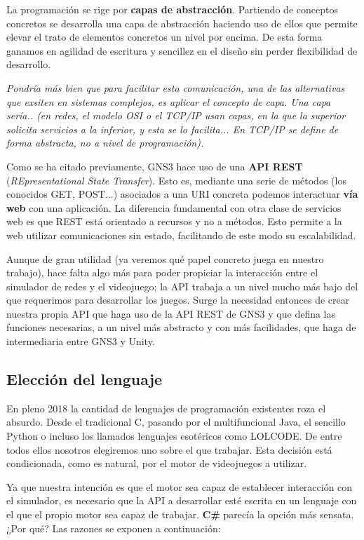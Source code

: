 La programación se rige por \textbf{capas de abstracción}. Partiendo de conceptos concretos se desarrolla una capa de abstracción haciendo uso de ellos que permite elevar el trato de elementos concretos un nivel por encima\cite{abstraction}. De esta forma ganamos en agilidad de escritura y sencillez en el diseño sin perder flexibilidad de desarrollo.

\textit{Pondría más bien que para facilitar esta comunicación, una de las alternativas que exsiten en sistemas complejos, es aplicar el concepto de capa. Una capa sería.. (en redes, el modelo OSI o el TCP/IP usan capas, en la que la superior solicita servicios a la inferior, y esta se lo facilita... En TCP/IP se define de forma abstracta, no a nivel de programación).}

Como se ha citado previamente, GNS3 hace uso de una \textbf{API REST} (\textit{REpresentational State Transfer}). Esto es, mediante una serie de métodos (los conocidos GET, POST...) asociados a una URI concreta podemos interactuar \textbf{vía web} con una aplicación. La diferencia fundamental con otra clase de servicios web es que REST está orientado a recursos y no a métodos. Esto permite a la web utilizar comunicaciones sin estado, facilitando de este modo su escalabilidad\cite{REST}.

Aunque de gran utilidad (ya veremos qué papel concreto juega en nuestro trabajo), hace falta algo más para poder propiciar la interacción entre el simulador de redes y el videojuego; la API trabaja a un nivel mucho más bajo del que requerimos para desarrollar los juegos. Surge la necesidad entonces de crear nuestra propia API que haga uso de la API REST de GNS3 y que defina las funciones necesarias, a un nivel más abstracto y con más facilidades, que haga de intermediaria entre GNS3 y Unity.

\subsection{Elección del lenguaje}
En pleno 2018 la cantidad de lenguajes de programación existentes roza el absurdo. Desde el tradicional C, pasando por el multifuncional Java, el sencillo Python o incluso los llamados lenguajes esotéricos como LOLCODE\cite{esotericlang}. De entre todos ellos nosotros elegiremos uno sobre el que trabajar. Esta decisión está condicionada, como es natural, por el motor de videojuegos a utilizar.

Ya que nuestra intención es que el motor sea capaz de establecer interacción con el simulador, es necesario que la API a desarrollar esté escrita en un lenguaje con el que el propio motor sea capaz de trabajar. \textbf{C\#} parecía la opción más sensata. ¿Por qué? Las razones se exponen a continuación:

